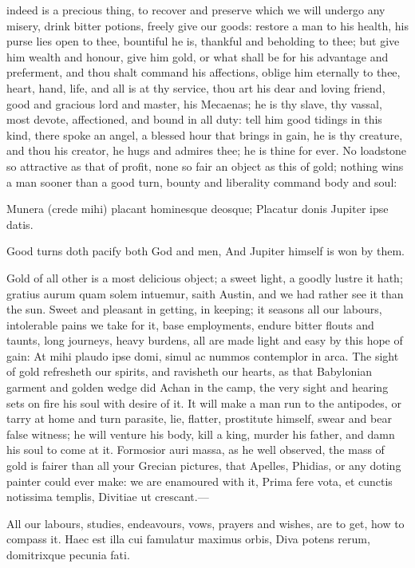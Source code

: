 {indeed is a precious thing, to recover and preserve which we will
undergo any misery, drink bitter potions, freely give our goods:
restore a man to his health, his purse lies open to thee, bountiful he
is, thankful and beholding to thee; but give him wealth and honour,
give him gold, or what shall be for his advantage and preferment, and
thou shalt command his affections, oblige him eternally to thee, heart,
hand, life, and all is at thy service, thou art his dear and loving
friend, good and gracious lord and master, his Mecaenas; he is thy
slave, thy vassal, most devote, affectioned, and bound in all duty:
tell him good tidings in this kind, there spoke an angel, a blessed
hour that brings in gain, he is thy creature, and thou his creator, he
hugs and admires thee; he is thine for ever. No loadstone so attractive
as that of profit, none so fair an object as this of gold;
nothing wins a man sooner than a good turn, bounty and liberality
command body and soul:

Munera (crede mihi) placant hominesque deosque;
Placatur donis Jupiter ipse datis.


Good turns doth pacify both God and men,
And Jupiter himself is won by them.

Gold of all other is a most delicious object; a sweet light, a goodly
lustre it hath; gratius aurum quam solem intuemur, saith Austin, and we
had rather see it than the sun. Sweet and pleasant in getting, in
keeping; it seasons all our labours, intolerable pains we take for it,
base employments, endure bitter flouts and taunts, long journeys, heavy
burdens, all are made light and easy by this hope of gain: At mihi
plaudo ipse domi, simul ac nummos contemplor in arca. The sight of gold
refresheth our spirits, and ravisheth our hearts, as that Babylonian
garment and  golden wedge did Achan in the camp, the very sight
and hearing sets on fire his soul with desire of it. It will make a man
run to the antipodes, or tarry at home and turn parasite, lie, flatter,
prostitute himself, swear and bear false witness; he will venture his
body, kill a king, murder his father, and damn his soul to come at it.
Formosior auri massa, as  he well observed, the mass of gold is
fairer than all your Grecian pictures, that Apelles, Phidias, or any
doting painter could ever make: we are enamoured with it,
Prima fere vota, et cunctis notissima templis,
Divitiae ut crescant.---

All our labours, studies, endeavours, vows, prayers and wishes, are to
get, how to compass it.
Haec est illa cui famulatur maximus orbis,
Diva potens rerum, domitrixque pecunia fati.

}

